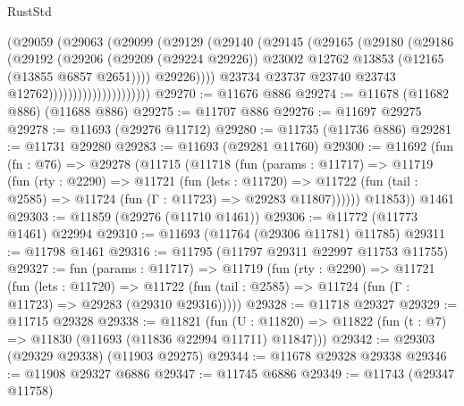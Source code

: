 \begin{lexlean}{RustStd}
\begin{coremodule}
                                    (@29059
                                      (@29063
                                        (@29099
                                          (@29129
                                            (@29140
                                              (@29145
                                                (@29165
                                                  (@29180
                                                    (@29186
                                                      (@29192
                                                        (@29206
                                                          (@29209 (@29224 @29226))
                                                          @23002
                                                          @12762
                                                          @13853
                                                          (@12165 (@13855 @6857 @2651))))
                                                      @29226))))
                                              @23734
                                              @23737
                                              @23740
                                              @23743
                                              @12762)))))))))))))))))))))
@29270 := @11676 @886
@29274 := @11678 (@11682 @886) (@11688 @886)
@29275 := @11707 @886
@29276 := @11697 @29275
@29278 := @11693 (@29276 @11712)
@29280 := @11735 (@11736 @886)
@29281 := @11731 @29280
@29283 := @11693 (@29281 @11760)
@29300 := @11692
    (fun (fn : @76) =>
    @29278
      (@11715
        (@11718
          (fun (params : @11717) =>
          @11719
            (fun (rty : @2290) =>
            @11721
              (fun (lets : @11720) =>
              @11722 (fun (tail : @2585) => @11724 (fun (Γ : @11723) => @29283 @11807))))))
        @11853))
    @1461
@29303 := @11859 (@29276 (@11710 @1461))
@29306 := @11772 (@11773 @1461) @22994
@29310 := @11693 (@11764 (@29306 @11781) @11785)
@29311 := @11798 @1461
@29316 := @11795 (@11797 @29311 @22997 @11753 @11755)
@29327 := fun (params : @11717) =>
  @11719
    (fun (rty : @2290) =>
    @11721
      (fun (lets : @11720) =>
      @11722 (fun (tail : @2585) => @11724 (fun (Γ : @11723) => @29283 (@29310 @29316)))))
@29328 := @11718 @29327
@29329 := @11715 @29328
@29338 := @11821
    (fun (U : @11820) => @11822 (fun (t : @7) => @11830 (@11693 (@11836 @22994 @11711) @11847)))
@29342 := @29303 (@29329 @29338) (@11903 @29275)
@29344 := @11678 @29328 @29338
@29346 := @11908 @29327 @6886
@29347 := @11745 @6886
@29349 := @11743 (@29347 @11758)

\end{coremodule}
\end{lexlean}
